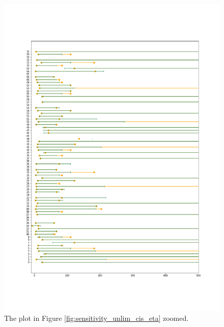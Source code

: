 \begin{figure}
    \centering
    \includegraphics[scale=0.36]{pictures/Sensitivity/ci_unlim_eta_zoomed.png}
    \caption[CIs for $\eta$, unlimited. Zoomed]{The plot in Figure \ref{fig:sensitivity_unlim_cis_eta} zoomed.}
    \label{fig:sensitivity_unlim_cis_eta_zoomed}
\end{figure}










